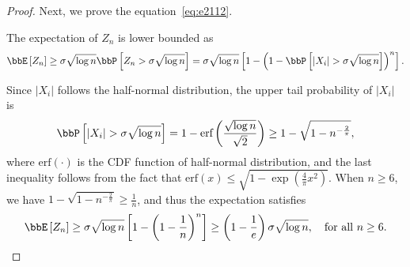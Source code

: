 \documentclass[11pt]{article}
\newcommand{\of}[1]{\left(#1\right)}
\newcommand{\off}[1]{\left[#1\right]}
\theoremstyle{plain}
\theoremstyle{definition}
\begin{document}
\begin{proof}
	 
	 \vspace{0.2cm}
	 Next, we prove the equation~\eqref{eq:e2112}.
	 
	 \vspace{0.2cm}
	 
	 The expectation of $Z_n$ is lower bounded as
	 \begin{equation}
	 	\bbE \off{Z_n} \geq \sigma \sqrt{\log n} \bbP \off{Z_n > \sigma \sqrt{\log n}}  = \sigma \sqrt{\log n} \off{1 - \of{1 - \bbP \off{|X_i| > \sigma \sqrt{\log n}}   }^n}.
	 \end{equation}
	 
	 Since $|X_i|$ follows the half-normal distribution, the upper tail probability of $|X_i|$ is
	 \begin{equation}
	 	\bbP \off{ |X_i| > \sigma \sqrt{\log n}} = 1 - \text{erf}\of{\frac{\sqrt{\log n}}{\sqrt{2} } } \geq 1 - \sqrt{1 - n^{-\frac{2}{\pi}}},
	 \end{equation} 
	 where $\text{erf}(\cdot)$ is the CDF function of half-normal distribution, and the last inequality follows from the fact that $\text{erf}(x) \leq \sqrt{1 - \exp \of{\frac{4}{\pi} x^2 }}$. When $n \geq 6$, we have $1 - \sqrt{1 - n^{-\frac{2}{\pi}}} \geq \frac{1}{n}$, and thus the expectation satisfies
	 \begin{equation}
	 	\bbE \off{Z_n} \geq \sigma \sqrt{\log n} \off{1 - \of{1 - \frac{1}{n}   }^n} \geq \of{1 - \frac{1}{e}} \sigma \sqrt{\log n}, \quad \text{for all }n \geq 6.
	 \end{equation}
	 
	 \iffalse
	 By Markov's inequality, the expectation of $Z_n$ satisfies
	 \begin{equation}
	 	\bbE[Z_n] \geq t \bbP[Z_n \geq t],\quad \text{for all }t \geq 0.
	 \end{equation}
	 By the independence of $\{X_i\}_{i=1}^n$, the tail probability of $Z_n$ is
	 \begin{equation}
	 	\bbP[Z_n \geq t] = 1 - (1 - \bbP(|X_1| \geq t))^n.
	 \end{equation}
	 
	 Let $t = \sqrt{2\sigma^2 \log n}$. By equation~\eqref{eq:e211proupper}, the tail probability of $X_1$ satisfies
	 \begin{equation}
	 	\bbP(|X_1| \geq \sqrt{2\sigma^2 \log n}) \leq \frac{2}{\sqrt{ \pi \log n}} \frac{1}{n} \leq \frac{1}{n},\quad \text{for all } n \geq 5.
	 \end{equation}	 
	 Hence, the tail probability of $Z_n$ with $t = \sqrt{2\sigma^2 \log n} $satisfies
	 \begin{equation}
	 	\bbP[Z_n \geq t] \geq 1 - 
	 \end{equation}
	 \fi
\end{proof}
\end{document}
